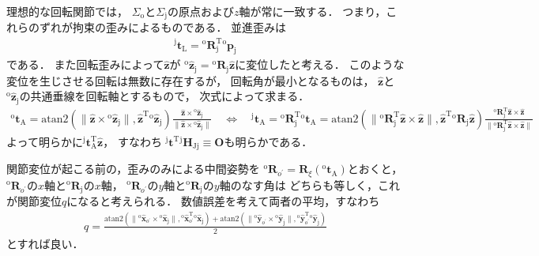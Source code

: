 ﻿\documentclass[a4paper]{jsarticle}
\begin{document}
理想的な回転関節では，
$\Sigma_{\mathrm{o}}$と$\Sigma_{\mathrm{j}}$の原点および$z$軸が常に一致する．
つまり，これらのずれが拘束の歪みによるものである．
並進歪みは
\begin{align*}
{}^{\mathrm{j}}\bm{t}_{\mathrm{L}}={}^{\mathrm{o}}\bm{R}_{\mathrm{j}}^{\mathrm{T}}{}^{\mathrm{o}}\bm{p}_{\mathrm{j}}
\end{align*}
である．
また回転歪みによって$\hat{\bm{z}}$が
${}^{\mathrm{o}}\hat{\bm{z}}_{\mathrm{j}}={}^{\mathrm{o}}\bm{R}_{\mathrm{j}}\hat{\bm{z}}$に変位したと考える．
このような変位を生じさせる回転は無数に存在するが，
回転角が最小となるものは，
$\hat{\bm{z}}$と${}^{\mathrm{o}}\hat{\bm{z}}_{\mathrm{j}}$の共通垂線を回転軸とするもので，
次式によって求まる．
\begin{align*}
{}^{\mathrm{o}}\bm{t}_{\mathrm{A}}
=\mathrm{atan2}(\|\hat{\bm{z}}\times{}^{\mathrm{o}}\hat{\bm{z}}_{\mathrm{j}}\|,\hat{\bm{z}}^{\mathrm{T}}{}^{\mathrm{o}}\hat{\bm{z}}_{\mathrm{j}})
\frac{\hat{\bm{z}}\times{}^{\mathrm{o}}\hat{\bm{z}}_{\mathrm{j}}}{\|\hat{\bm{z}}\times{}^{\mathrm{o}}\hat{\bm{z}}_{\mathrm{j}}\|}
\quad\Leftrightarrow\quad
{}^{\mathrm{j}}\bm{t}_{\mathrm{A}}
={}^{\mathrm{o}}\bm{R}_{\mathrm{j}}^{\mathrm{T}}{}^{\mathrm{o}}\bm{t}_{\mathrm{A}}
=\mathrm{atan2}(\|{}^{\mathrm{o}}\bm{R}_{\mathrm{j}}^{\mathrm{T}}\hat{\bm{z}}\times\hat{\bm{z}}\|,\hat{\bm{z}}^{\mathrm{T}}{}^{\mathrm{o}}\bm{R}_{\mathrm{j}}\hat{\bm{z}})
\frac{{}^{\mathrm{o}}\bm{R}_{\mathrm{j}}^{\mathrm{T}}\hat{\bm{z}}\times\hat{\bm{z}}}
{\|{}^{\mathrm{o}}\bm{R}_{\mathrm{j}}^{\mathrm{T}}\hat{\bm{z}}\times\hat{\bm{z}}\|}
\end{align*}
よって明らかに${}^{\mathrm{j}}\bm{t}_{\mathrm{A}}^{\mathrm{T}}\hat{\bm{z}}$，
すなわち
${}^{\mathrm{j}}\bm{t}^{\mathrm{T}}{}^{\mathrm{j}}\bm{H}_{\mathrm{Jj}}\equiv\bm{O}$も明らかである．


関節変位が起こる前の，歪みのみによる中間姿勢を
${}^{\mathrm{o}}\bm{R}_{o^{\prime}}=\bm{R}_{\xi}({}^{\mathrm{o}}\bm{t}_{\mathrm{A}})$とおくと，
${}^{\mathrm{o}}\bm{R}_{o^{\prime}}$の$x$軸と${}^{\mathrm{o}}\bm{R}_{\mathrm{j}}$の$x$軸，
${}^{\mathrm{o}}\bm{R}_{o^{\prime}}$の$y$軸と${}^{\mathrm{o}}\bm{R}_{\mathrm{j}}$の$y$軸のなす角は
どちらも等しく，これが関節変位$q$になると考えられる．
数値誤差を考えて両者の平均，すなわち
\begin{align*}
q=\frac{
 \mathrm{atan2}(\|{}^{\mathrm{o}}\hat{\bm{x}}_{o^{\prime}}\times{}^{\mathrm{o}}\hat{\bm{x}}_{\mathrm{j}}\|,
        {}^{\mathrm{o}}\hat{\bm{x}}_{o^{\prime}}^{\mathrm{T}}{}^{\mathrm{o}}\hat{\bm{x}}_{\mathrm{j}})
+\mathrm{atan2}(\|{}^{\mathrm{o}}\hat{\bm{y}}_{o^{\prime}}\times{}^{\mathrm{o}}\hat{\bm{y}}_{\mathrm{j}}\|,
        {}^{\mathrm{o}}\hat{\bm{y}}_{o^{\prime}}^{\mathrm{T}}{}^{\mathrm{o}}\hat{\bm{y}}_{\mathrm{j}})
 }{2}
\end{align*}
とすれば良い．
\end{document}
